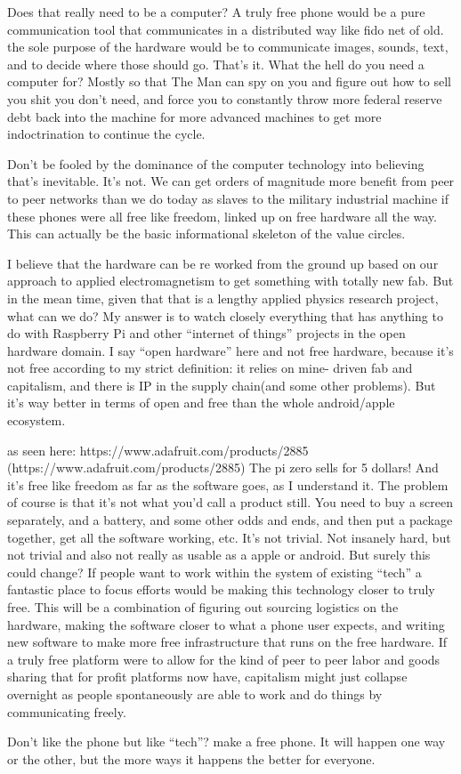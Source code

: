 Does that really need to be a computer? A truly free phone would be a
pure communication tool that communicates in a distributed way like fido
net of old. the sole purpose of the hardware would be to communicate
images, sounds, text, and to decide where those should go. That's it.
What the hell do you need a computer for? Mostly so that The Man can spy
on you and figure out how to sell you shit you don't need, and force you
to constantly throw more federal reserve debt back into the machine for
more advanced machines to get more indoctrination to continue the cycle.

Don't be fooled by the dominance of the computer technology into
believing that's inevitable. It's not. We can get orders of magnitude
more benefit from peer to peer networks than we do today as slaves to
the military industrial machine if these phones were all free like
freedom, linked up on free hardware all the way. This can actually be
the basic informational skeleton of the value circles.

I believe that the hardware can be re worked from the ground up based on
our approach to applied electromagnetism to get something with totally
new fab. But in the mean time, given that that is a lengthy applied
physics research project, what can we do? My answer is to watch closely
everything that has anything to do with Raspberry Pi and other
``internet of things'' projects in the open hardware domain. I say
``open hardware'' here and not free hardware, because it's not free
according to my strict definition: it relies on mine- driven fab and
capitalism, and there is IP in the supply chain(and some other
problems). But it's way better in terms of open and free than the whole
android/apple ecosystem.

as seen here: https://www.adafruit.com/products/2885
(https://www.adafruit.com/products/2885) The pi zero sells for 5
dollars! And it's free like freedom as far as the software goes, as I
understand it. The problem of course is that it's not what you'd call a
product still. You need to buy a screen separately, and a battery, and
some other odds and ends, and then put a package together, get all the
software working, etc. It's not trivial. Not insanely hard, but not
trivial and also not really as usable as a apple or android. But surely
this could change? If people want to work within the system of existing
``tech'' a fantastic place to focus efforts would be making this
technology closer to truly free. This will be a combination of figuring
out sourcing logistics on the hardware, making the software closer to
what a phone user expects, and writing new software to make more free
infrastructure that runs on the free hardware. If a truly free platform
were to allow for the kind of peer to peer labor and goods sharing that
for profit platforms now have, capitalism might just collapse overnight
as people spontaneously are able to work and do things by communicating
freely.

Don't like the phone but like ``tech''? make a free phone. It will
happen one way or the other, but the more ways it happens the better for
everyone.
